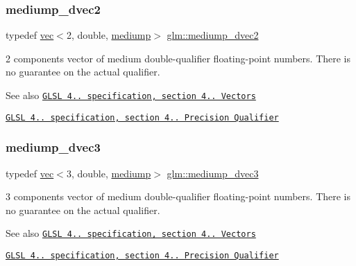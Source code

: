 \subsubsection{\texorpdfstring{mediump\+\_\+dvec2}{mediump\_dvec2}}
{\footnotesize\ttfamily typedef \mbox{\hyperlink{structglm_1_1vec}{vec}}$<$2, double, \mbox{\hyperlink{namespaceglm_a36ed105b07c7746804d7fdc7cc90ff25a6416f3ea0c9025fb21ed50c4d6620482}{mediump}}$>$ \mbox{\hyperlink{group__core__precision_ga71307e1aa231cbc5d9de712a92714496}{glm\+::mediump\+\_\+dvec2}}}

2 components vector of medium double-\/qualifier floating-\/point numbers. There is no guarantee on the actual qualifier.

\begin{DoxySeeAlso}{See also}
\href{http://www.opengl.org/registry/doc/GLSLangSpec.4.20.8.pdf}{\tt G\+L\+SL 4.. specification, section 4.. Vectors} 

\href{http://www.opengl.org/registry/doc/GLSLangSpec.4.20.8.pdf}{\tt G\+L\+SL 4.. specification, section 4.. Precision Qualifier} 
\end{DoxySeeAlso}
\mbox{\label{group__core__precision_ga11d5fecb18f3d7e5f7add0663a8d7d3f}} 
\subsubsection{\texorpdfstring{mediump\+\_\+dvec3}{mediump\_dvec3}}
{\footnotesize\ttfamily typedef \mbox{\hyperlink{structglm_1_1vec}{vec}}$<$3, double, \mbox{\hyperlink{namespaceglm_a36ed105b07c7746804d7fdc7cc90ff25a6416f3ea0c9025fb21ed50c4d6620482}{mediump}}$>$ \mbox{\hyperlink{group__core__precision_ga11d5fecb18f3d7e5f7add0663a8d7d3f}{glm\+::mediump\+\_\+dvec3}}}

3 components vector of medium double-\/qualifier floating-\/point numbers. There is no guarantee on the actual qualifier.

\begin{DoxySeeAlso}{See also}
\href{http://www.opengl.org/registry/doc/GLSLangSpec.4.20.8.pdf}{\tt G\+L\+SL 4.. specification, section 4.. Vectors} 

\href{http://www.opengl.org/registry/doc/GLSLangSpec.4.20.8.pdf}{\tt G\+L\+SL 4.. specification, section 4.. Precision Qualifier} 
\end{DoxySeeAlso}
\mbox{\label{group__core__precision_ga860fd4068c3e89885f814e3b8f312f2f}} 
